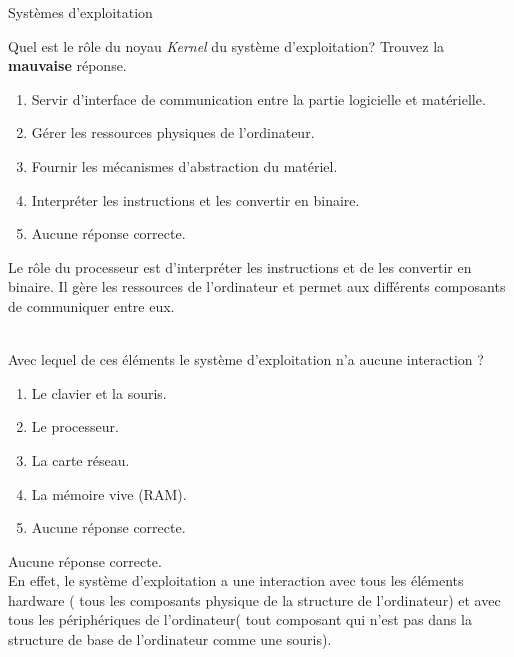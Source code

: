 \begin{section}{Systèmes d'exploitation}
    \begin{Exercice}[3 minutes]
        Quel est le rôle du noyau \textit{Kernel} du système d'exploitation? Trouvez la \textbf{mauvaise} réponse.
        \begin{enumerate}
            \item Servir d'interface de communication entre la partie logicielle et matérielle.
            \item Gérer les ressources physiques de l'ordinateur.
            \item Fournir les mécanismes d'abstraction du matériel.
            \item Interpréter les instructions et les convertir en binaire.
            \item Aucune réponse correcte.
        \end{enumerate}
    \end{Exercice}
    \begin{solution}
                Le rôle du processeur est d'interpréter les instructions et de les convertir en binaire. Il gère les ressources de l'ordinateur et permet aux différents composants de communiquer entre eux.
    \end{solution}
    
    \begin{Exercice}[3 minutes]\\
    Avec lequel de ces éléments le système d'exploitation n'a aucune interaction ?
        \begin{enumerate}
            \item Le clavier et la souris.
            \item Le processeur.
            \item La carte réseau.
            \item La mémoire vive (RAM).
            \item Aucune réponse correcte.
        \end{enumerate}
    \end{Exercice}
    \begin{solution}
            Aucune réponse correcte. \\
        
	    En effet, le système d'exploitation a une interaction avec tous les éléments hardware ( tous les composants physique de la structure de l'ordinateur) et avec tous les périphériques de l'ordinateur( tout composant qui n'est pas dans la structure de base de l'ordinateur comme une souris).  \\
    \end{solution}


\end{section}

